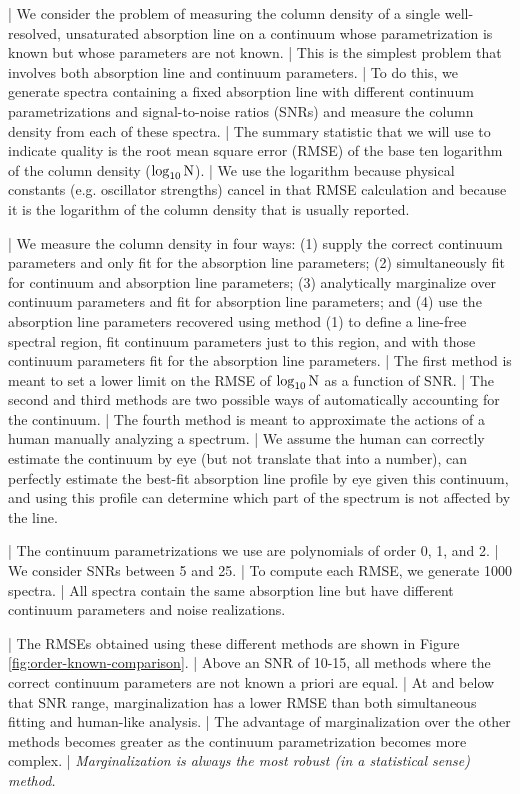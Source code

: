 \documentclass[manuscript]{aastex62}
\begin{document}
| We consider the problem of measuring the column density of a single well-resolved, unsaturated absorption line on a continuum whose parametrization is known but whose parameters are not known.
| This is the simplest problem that involves both absorption line and continuum parameters.
| To do this, we generate spectra containing a fixed absorption line with different continuum parametrizations and signal-to-noise ratios (SNRs) and measure the column density from each of these spectra.
| The summary statistic that we will use to indicate quality is the root mean square error (RMSE) of the base ten logarithm of the column density ($\log_{10}{\rm N}$).
| We use the logarithm because physical constants (e.g. oscillator strengths) cancel in that RMSE calculation and because it is the logarithm of the column density that is usually reported.

| We measure the column density in four ways: (1) supply the correct continuum parameters and only fit for the absorption line parameters; (2) simultaneously fit for continuum and absorption line parameters; (3) analytically marginalize over continuum parameters and fit for absorption line parameters; and (4) use the absorption line parameters recovered using method (1) to define a line-free spectral region, fit continuum parameters just to this region, and with those continuum parameters fit for the absorption line parameters.
| The first method is meant to set a lower limit on the RMSE of $\log_{10}{\rm N}$ as a function of SNR.
| The second and third methods are two possible ways of automatically accounting for the continuum.
| The fourth method is meant to approximate the actions of a human manually analyzing a spectrum.
| We assume the human can correctly estimate the continuum by eye (but not translate that into a number), can perfectly estimate the best-fit absorption line profile by eye given this continuum, and using this profile can determine which part of the spectrum is not affected by the line.

| The continuum parametrizations we use are polynomials of order 0, 1, and 2.
| We consider SNRs between 5 and 25.
| To compute each RMSE, we generate 1000 spectra.
| All spectra contain the same absorption line but have different continuum parameters and noise realizations.

| The RMSEs obtained using these different methods are shown in Figure \ref{fig:order-known-comparison}.
| Above an SNR of 10-15, all methods where the correct continuum parameters are not known a priori are equal.
| At and below that SNR range, marginalization has a lower RMSE than both simultaneous fitting and human-like analysis.
| The advantage of marginalization over the other methods becomes greater as the continuum parametrization becomes more complex.
| \emph{Marginalization is always the most robust (in a statistical sense) method.}
\end{document}
